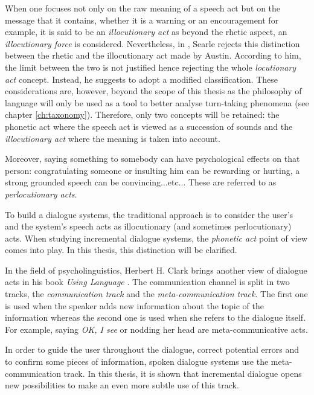 			When one focuses not only on the raw meaning of a speech act but on the message that it contains, whether it is a warning or an encouragement for example, it is said to be an \textit{illocutionary act} as beyond the rhetic aspect, an \textit{illocutionary force} is considered. Nevertheless, in \cite{Searle1968}, Searle rejects this distinction between the rhetic and the illocutionary act made by Austin. According to him, the limit between the two is not justified hence rejecting the whole \textit{locutionary act} concept. Instead, he suggests to adopt a modified classification. These considerations are, however, beyond the scope of this thesis as the philosophy of language will only be used as a tool to better analyse turn-taking phenomena (see chapter \ref{ch:taxonomy}). Therefore, only two concepts will be retained: the phonetic act where the speech act is viewed as a succession of sounds and the \textit{illocutionary act} where the meaning is taken into account.
			
			Moreover, saying something to somebody can have psychological effects on that person: congratulating someone or insulting him can be rewarding or hurting, a strong grounded speech can be convincing...etc... These are referred to as \textit{perlocutionary acts}.
			
			To build a dialogue systems, the traditional approach is to consider the user's and the system's speech acts as illocutionary (and sometimes perlocutionary) acts. When studying incremental dialogue systems, the \textit{phonetic act} point of view comes into play. In this thesis, this distinction will be clarified.
			
			In the field of psycholinguistics, Herbert H. Clark brings another view of dialogue acts in his book \textit{Using Language} \cite{Clark1996}. The communication channel is split in two tracks, the \textit{communication track} and the \textit{meta-communication track}. The first one is used when the speaker adds new information about the topic of the information whereas the second one is used when she refers to the dialogue itself. For example, saying \textit{OK, I see} or nodding her head are meta-communicative acts. 
        
			In order to guide the user throughout the dialogue, correct potential errors and to confirm some pieces of information, spoken dialogue systems use the meta-communication track. In this thesis, it is shown that incremental dialogue opens new possibilities to make an even more subtle use of this track.
        

